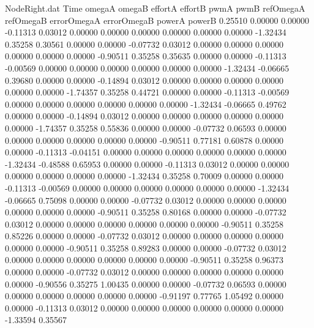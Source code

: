 \begin{filecontents}{NodeRight.dat}
Time omegaA omegaB effortA effortB pwmA pwmB refOmegaA refOmegaB errorOmegaA errorOmegaB powerA powerB
   0.25510    0.00000    0.00000    -0.11313    0.03012    0.00000    0.00000    0.00000    0.00000    0.00000    0.00000   -1.32434    0.35258
   0.30561    0.00000    0.00000    -0.07732    0.03012    0.00000    0.00000    0.00000    0.00000    0.00000    0.00000   -0.90511    0.35258
   0.35635    0.00000    0.00000    -0.11313   -0.00569    0.00000    0.00000    0.00000    0.00000    0.00000    0.00000   -1.32434   -0.06665
   0.39680    0.00000    0.00000    -0.14894    0.03012    0.00000    0.00000    0.00000    0.00000    0.00000    0.00000   -1.74357    0.35258
   0.44721    0.00000    0.00000    -0.11313   -0.00569    0.00000    0.00000    0.00000    0.00000    0.00000    0.00000   -1.32434   -0.06665
   0.49762    0.00000    0.00000    -0.14894    0.03012    0.00000    0.00000    0.00000    0.00000    0.00000    0.00000   -1.74357    0.35258
   0.55836    0.00000    0.00000    -0.07732    0.06593    0.00000    0.00000    0.00000    0.00000    0.00000    0.00000   -0.90511    0.77181
   0.60878    0.00000    0.00000    -0.11313   -0.04151    0.00000    0.00000    0.00000    0.00000    0.00000    0.00000   -1.32434   -0.48588
   0.65953    0.00000    0.00000    -0.11313    0.03012    0.00000    0.00000    0.00000    0.00000    0.00000    0.00000   -1.32434    0.35258
   0.70009    0.00000    0.00000    -0.11313   -0.00569    0.00000    0.00000    0.00000    0.00000    0.00000    0.00000   -1.32434   -0.06665
   0.75098    0.00000    0.00000    -0.07732    0.03012    0.00000    0.00000    0.00000    0.00000    0.00000    0.00000   -0.90511    0.35258
   0.80168    0.00000    0.00000    -0.07732    0.03012    0.00000    0.00000    0.00000    0.00000    0.00000    0.00000   -0.90511    0.35258
   0.85226    0.00000    0.00000    -0.07732    0.03012    0.00000    0.00000    0.00000    0.00000    0.00000    0.00000   -0.90511    0.35258
   0.89283    0.00000    0.00000    -0.07732    0.03012    0.00000    0.00000    0.00000    0.00000    0.00000    0.00000   -0.90511    0.35258
   0.96373    0.00000    0.00000    -0.07732    0.03012    0.00000    0.00000    0.00000    0.00000    0.00000    0.00000   -0.90556    0.35275
   1.00435    0.00000    0.00000    -0.07732    0.06593    0.00000    0.00000    0.00000    0.00000    0.00000    0.00000   -0.91197    0.77765
   1.05492    0.00000    0.00000    -0.11313    0.03012    0.00000    0.00000    0.00000    0.00000    0.00000    0.00000   -1.33594    0.35567

\end{filecontents}
